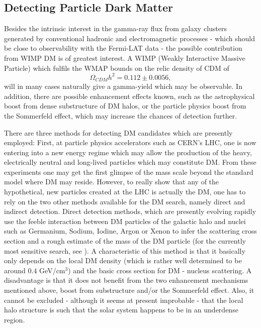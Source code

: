 \documentclass[10pt,aps,pra,reprint,amsmath,amsfonts,amssymb,showpacs,nofootinbib,floatfix]{revtex4-1}
\begin{document}
\subsection{Detecting Particle Dark Matter}
\label{sect:PF}
Besides the intrinsic interest in the gamma-ray flux from galaxy
clusters generated by conventional hadronic and electromagnetic
processes - which should be close to observability with the Fermi-LAT
data
\cite{1997ApJ...487..529B,2007A&A...473...41E,2010MNRAS.409..449P} -
the possible contribution from WIMP DM is of greatest interest. A WIMP
(Weakly Interactive Massive Particle) which fulfils the WMAP bounds on
the relic density of CDM of \cite{Komatsu:2010fb}
$$\Omega_{CDM}h^2=0.112\pm 0.0056,$$ will in many cases naturally give
a gamma-yield which may be observable. In addition, there are possible
enhancement effects known, such as the astrophysical boost from dense
substructure of DM halos, or the particle physics boost from the
Sommerfeld effect, which may increase the chances of detection
further.

There are three methods for detecting DM candidates which are
presently employed: First, at particle physics accelerators such as
CERN's LHC, one is now entering into a new energy regime which may
allow the production of the heavy, electrically neutral and long-lived
particles which may constitute DM. From these experiments one may get
the first glimpse of the mass scale beyond the standard model where DM
may reside. However, to really show that any of the hypothetical, new
particles created at the LHC is actually the DM, one has to rely on
the two other methods available for the DM search, namely direct and
indirect detection. Direct detection methods, which are presently
evolving rapidly use the feeble interaction between DM particles of
the galactic halo and nuclei such as Germanium, Sodium, Iodine, Argon
or Xenon to infer the scattering cross section and a rough estimate of
the mass of the DM particle (for the currently most sensitive search,
see \cite{Aprile:2010um,Aprile:2011hi}). A characteristic of this
method is that it basically only depends on the local DM density
(which is rather well determined to be around $0.4$ GeV/cm$^3$) and
the basic cross section for DM - nucleus scattering. A disadvantage is
that it does not benefit from the two enhancement mechanisms mentioned
above, boost from substructure and/or the Sommerfeld effect. Also, it
cannot be excluded - although it seems at present improbable - that
the local halo structure is such that the solar system happens to be
in an underdense region.
\end{document}
